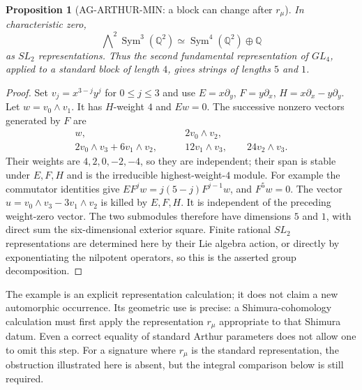 \documentclass[11pt,a4paper]{article}
\newtheorem{proposition}{Proposition}
\begin{document}
\begin{proposition}[AG-ARTHUR-MIN: a block can change after $r_\mu$]
In characteristic zero,
\[
 \bigwedge\nolimits^2\operatorname{Sym}^3(\mathbb Q^2)
       \simeq\operatorname{Sym}^4(\mathbb Q^2)\oplus\mathbb Q
\]
as $SL_2$ representations. Thus the second fundamental
representation of $GL_4$, applied to a standard block of length
$4$, gives strings of lengths $5$ and $1$.
\end{proposition}
\begin{proof}
Set $v_j=x^{3-j}y^j$ for $0\le j\le3$ and use
$E=x\partial_y$, $F=y\partial_x$,
$H=x\partial_x-y\partial_y$. Let $w=v_0\wedge v_1$.
It has $H$-weight $4$ and $Ew=0$. The successive nonzero
vectors generated by $F$ are
\[
 \begin{split}
 w,&\qquad 2v_0\wedge v_2,\\
 2v_0\wedge v_3+6v_1\wedge v_2,&\qquad
 12v_1\wedge v_3,\qquad24v_2\wedge v_3.
 \end{split}
\]
Their weights are $4,2,0,-2,-4$, so they are independent;
their span is stable under $E,F,H$ and is the irreducible
highest-weight-$4$ module. For example the commutator identities
give $EF^jw=j(5-j)F^{j-1}w$, and $F^5w=0$.
The vector
$u=v_0\wedge v_3-3v_1\wedge v_2$ is killed by $E,F,H$.
It is independent of the preceding weight-zero vector.
The two submodules therefore have dimensions $5$ and $1$,
with direct sum the six-dimensional exterior square. Finite
rational $SL_2$ representations are determined here by their
Lie algebra action, or directly by exponentiating the nilpotent
operators, so this is the asserted group decomposition.
\end{proof}

The example is an explicit representation calculation; it does
not claim a new automorphic occurrence. Its geometric use is
precise: a Shimura-cohomology calculation must first apply the
representation $r_\mu$ appropriate to that Shimura datum.
Even a correct equality of standard Arthur parameters does not
allow one to omit this step. For a signature where $r_\mu$ is
the standard representation, the obstruction illustrated here
is absent, but the integral comparison below is still required.
\end{document}
